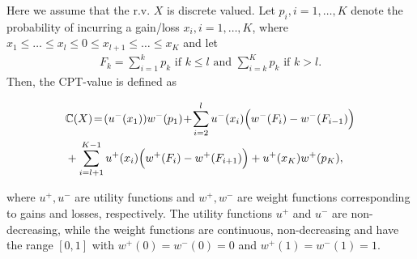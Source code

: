 Here we assume that the r.v. $X$ is discrete valued. 
Let $p_i, i=1,\ldots,K$ denote the probability of incurring a gain/loss $x_i, i=1,\ldots,K$, where 
$x_1\le \ldots \le x_l \le 0 \le x_{l+1} \le \ldots \le x_K$ and  let
\begin{align}
\label{eq:Fk}
 F_k = 
   \sum_{i=1}^k p_k  \text{ if   } k \leq l \text{ and }
   \sum_{i=k}^K p_k  \text{ if  }  k > l.
\end{align}
Then, the CPT-value is defined as 
\begin{small}
\begin{align*}
&\mathbb{C}(X) \!=\! (u^-(x_1)) w^-(p_1) 
\!+\!\sum_{i=2}^l u^-(x_i) \Big(w^-(F_i) - w^-(F_{i-1})\Big) \\
& + \sum_{i=l+1}^{K-1} u^+(x_i) \Big(w^+(F_i) - w^+(F_{i+1}) \Big)
 + u^+(x_K) w^+(p_K),
\end{align*} 
\end{small}
where $u^+, u^-$ are utility functions and $w^+, w^-$ are weight functions corresponding to gains and losses, respectively. The utility functions $u^+$ and $u^-$ are non-decreasing, while the weight functions are continuous, non-decreasing and have the range $[0,1]$ with $w^+(0)=w^-(0)=0$ and $w^+(1)=w^-(1)=1$. 


